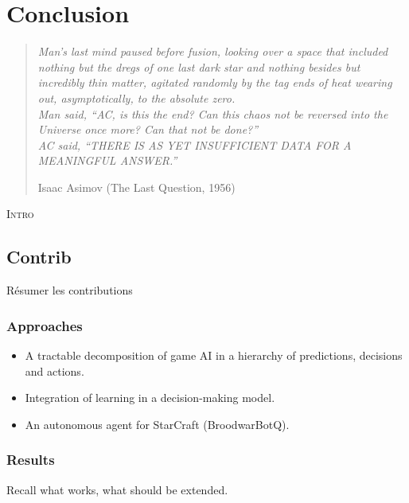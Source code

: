 \chapter{Conclusion}
\begin{quotation}\textit{
Man's last mind paused before fusion, looking over a space that included nothing but the dregs of one last dark star and nothing besides but incredibly thin matter, agitated randomly by the tag ends of heat wearing out, asymptotically, to the absolute zero.\\
Man said, ``AC, is this the end? Can this chaos not be reversed into the Universe once more? Can that not be done?''\\
AC said, ``THERE IS AS YET INSUFFICIENT DATA FOR A MEANINGFUL ANSWER.''
}
\begin{flushright}Isaac Asimov (The Last Question, 1956)\end{flushright}\end{quotation}

\lettrine{I}{ntro}

\section{Contrib}
Résumer les contributions
\subsection{Approaches}
\begin{itemize}
\item A tractable decomposition of game AI in a hierarchy of predictions, decisions and actions.
\item Integration of learning in a decision-making model. 
\item An autonomous agent for StarCraft (BroodwarBotQ).
\end{itemize}

\subsection{Results}
Recall what works, what should be extended.

